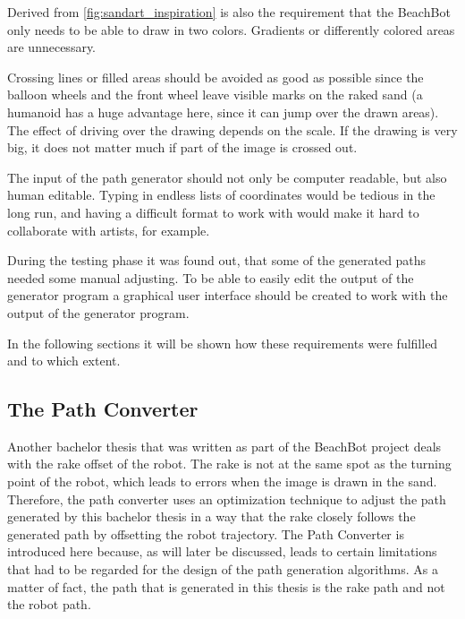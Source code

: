 Derived from \autoref{fig:sandart_inspiration} is also the requirement that the BeachBot only needs to be able to draw in two colors. Gradients or differently colored areas are unnecessary.

Crossing lines or filled areas should be avoided as good as possible since the balloon wheels and the front wheel leave visible marks on the raked sand (a humanoid has a huge advantage here, since it can jump over the drawn areas). The effect of driving over the drawing depends on the scale. If the drawing is very big, it does not matter much if part of the image is crossed out. 

The input of the path generator should not only be computer readable, but also human editable. Typing in endless lists of coordinates would be tedious in the long run, and having a difficult format to work with would make it hard to collaborate with artists, for example. 

During the testing phase it was found out, that some of the generated paths needed some manual adjusting. To be able to easily edit the output of the generator program a graphical user interface should be created to work with the output of the generator program. 

In the following sections it will be shown how these requirements were fulfilled and to which extent.

\subsection{The Path Converter}\label{sec:pathconv}

Another bachelor thesis that was written as part of the BeachBot project deals with the rake offset of the robot. The rake is not at the same spot as the turning point of the robot, which leads to errors when the image is drawn in the sand. Therefore, the path converter uses an optimization technique to adjust the path generated by this bachelor thesis in a way that the rake closely follows the generated path by offsetting the robot trajectory. The Path Converter is introduced here because, as will later be discussed, leads to certain limitations that had to be regarded for the design of the path generation algorithms. As a matter of fact, the path that is generated in this thesis is the rake path and not the robot path.